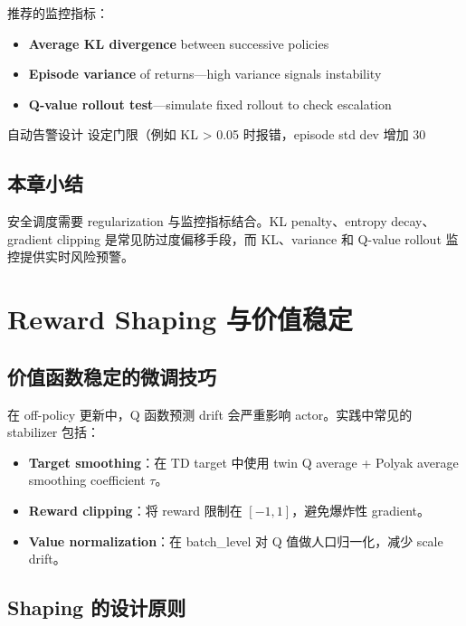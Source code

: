 \documentclass[a4paper]{article}
\begin{document}
推荐的监控指标：

\begin{itemize}
    \item \textbf{Average KL divergence} between successive policies
    \item \textbf{Episode variance} of returns—high variance signals instability
    \item \textbf{Q-value rollout test}—simulate fixed rollout to check escalation
\end{itemize}

\begin{knowledgebox}{自动告警设计}
设定门限（例如 KL > 0.05 时报错，episode std dev 增加 30%
\end{knowledgebox}

\subsection{本章小结}

安全调度需要 regularization 与监控指标结合。KL penalty、entropy decay、gradient clipping 是常见防过度偏移手段，而 KL、variance 和 Q-value rollout 监控提供实时风险预警。

\section{Reward Shaping 与价值稳定}

\subsection{价值函数稳定的微调技巧}

在 off-policy 更新中，Q 函数预测 drift 会严重影响 actor。实践中常见的 stabilizer 包括：

\begin{itemize}
    \item \textbf{Target smoothing}：在 TD target 中使用 twin Q average + Polyak average smoothing coefficient $\tau$。
    \item \textbf{Reward clipping}：将 reward 限制在 $[-1,1]$，避免爆炸性 gradient。
    \item \textbf{Value normalization}：在 batch_level 对 Q 值做人口归一化，减少 scale drift。
\end{itemize}

\subsection{Shaping 的设计原则}
\end{document}
